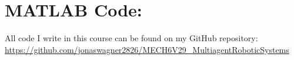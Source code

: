 \documentclass[]{article}
\numberwithin{equation}{section}
\newcommand{\st}{\ : \ }
\begin{document}
\section{}




\newpage
\appendix
\section{MATLAB Code:}\label{apx:matlab}
All code I write in this course can be found on my GitHub repository:\\
\href{https://github.com/jonaswagner2826/MECH6V29_MultiagentRoboticSystems}{https://github.com/jonaswagner2826/MECH6V29\_MultiagentRoboticSystems}


% 
\cite{*}
\end{document}
